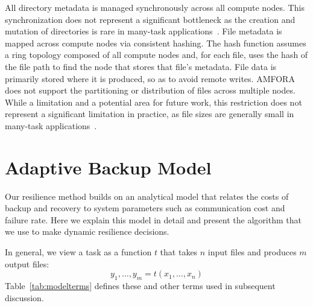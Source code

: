 \documentclass{sig-alternate}
\begin{document}
All directory metadata is managed synchronously across all compute nodes. This synchronization does not represent
a significant bottleneck as the creation 
and mutation of directories is rare in many-task applications~\cite{MTC-Bluewaters}.
File metadata is mapped across compute nodes via consistent hashing. 
The hash function assumes a ring topology composed of all compute nodes and, for each file,
uses the hash of the file path to find the node that stores that file's metadata.
File data is primarily stored where it is produced, so as to avoid remote writes. AMFORA does not
support the partitioning or distribution of files across multiple nodes. While a limitation and 
a potential area for future work, this restriction does not represent a significant limitation in practice, as file sizes are generally
small in many-task applications~\cite{MTC-Bluewaters}. 





\section{Adaptive Backup Model}
\label{sec:Model}

Our resilience method builds on an analytical model that relates the costs of backup and recovery to system parameters
such as communication cost and failure rate.
Here we explain this model in detail and present the algorithm that we use to make dynamic resilience decisions. 

In general, we view a task as a function $t$ that takes $n$ input files and produces $m$ output files:
\begin{equation}
y_{1}, \ldots, y_{m} = t(x_{1}, \ldots, x_{n})
\end{equation}
%
Table~\ref{tab:modelterms} defines these and other terms used in subsequent discussion.
\end{document}

